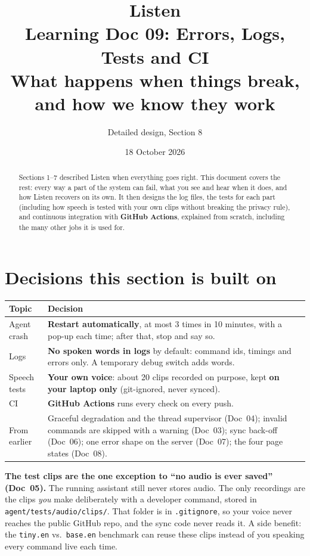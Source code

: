 \documentclass[11pt,a4paper]{article}
\title{\textbf{Listen}\\[4pt]\large Learning Doc 09: Errors, Logs, Tests and CI\\
       \normalsize What happens when things break, and how we know they work}
\author{Detailed design, Section 8}
\date{18 October 2026}
\begin{document}
\maketitle

\begin{abstract}
\noindent Sections 1--7 described Listen when everything goes right. This document covers the
rest: every way a part of the system can fail, what you see and hear when it does, and how
Listen recovers on its own. It then designs the log files, the tests for each part (including
how speech is tested with your own clips without breaking the privacy rule), and continuous
integration with \textbf{GitHub Actions}, explained from scratch, including the many other jobs
it is used for.
\end{abstract}

\tableofcontents
\newpage

\section{Decisions this section is built on}
\begin{center}
\renewcommand{\arraystretch}{1.2}
\begin{tabularx}{\textwidth}{l X}
\toprule
\textbf{Topic} & \textbf{Decision} \\
\midrule
Agent crash      & \textbf{Restart automatically}, at most 3 times in 10 minutes, with a pop-up each time; after that, stop and say so. \\
Logs             & \textbf{No spoken words in logs} by default: command ids, timings and errors only. A temporary debug switch adds words. \\
Speech tests     & \textbf{Your own voice}: about 20 clips recorded on purpose, kept \textbf{on your laptop only} (git-ignored, never synced). \\
CI               & \textbf{GitHub Actions} runs every check on every push. \\
From earlier     & Graceful degradation and the thread supervisor (Doc~04); invalid commands are skipped with a warning (Doc~03); sync back-off (Doc~06); one error shape on the server (Doc~07); the four page states (Doc~08). \\
\bottomrule
\end{tabularx}
\end{center}

\begin{caution}
\textbf{The test clips are the one exception to ``no audio is ever saved'' (Doc~05).} The
running assistant still never stores audio. The only recordings are the clips \emph{you} make
deliberately with a developer command, stored in \texttt{agent/tests/audio/clips/}. That folder
is in \texttt{.gitignore}, so your voice never reaches the public GitHub repo, and the sync code
never reads it. A side benefit: the \texttt{tiny.en} vs.\ \texttt{base.en} benchmark can reuse
these clips instead of you speaking every command live each time.
\end{caution}
\end{document}
